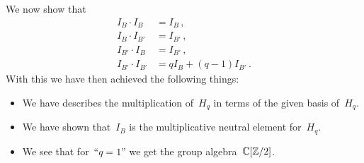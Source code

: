 We now show that
\begin{align*}
  I_B \cdot I_B       &=  I_B \,, \\
  I_B \cdot I_{B'}    &=  I_{B'} \,,  \\
  I_{B'} \cdot I_B    &=  I_{B'} \,,  \\
  I_{B'} \cdot I_{B'} &=  q I_B + (q-1) I_{B'} \,.
\end{align*}
With this we have then achieved the following things:
\begin{itemize}
  \item
    We have describes the multiplication of~$H_q$ in terms of the given basis of~$H_q$.
  \item
    We have shown that~$I_B$ is the multiplicative neutral element for~$H_q$.
  \item
    We see that for~\enquote{$q = 1$} we get the group algebra~$\mathbb{C}[\mathbb{Z}/2]$.
\end{itemize}

